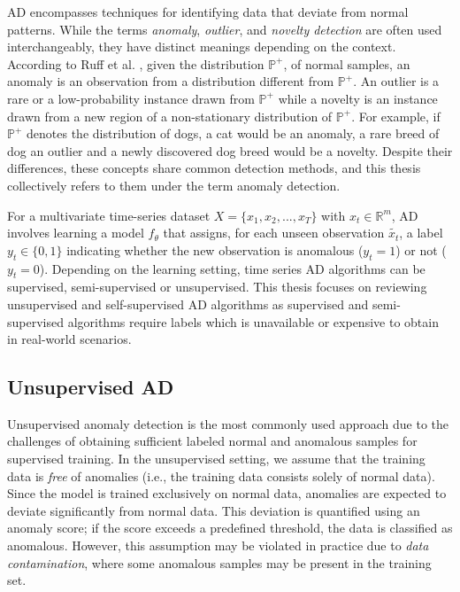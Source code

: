 \ac{AD} encompasses techniques for identifying data that deviate from normal patterns. While the terms \textit{anomaly}, \textit{outlier}, and \textit{novelty detection} are often used interchangeably, they have distinct meanings depending on the context. According to Ruff et al. \cite{ruff2021unifying}, given the distribution $\mathbb{P}^+$, of normal samples, an anomaly is an observation from a distribution different from $\mathbb{P}^+$. An outlier is a rare or a low-probability instance drawn from $\mathbb{P}^+$ while a novelty is an instance drawn from a new region of a non-stationary distribution of $\mathbb{P}^+$. For example, if $\mathbb{P}^+$ denotes the distribution of dogs, a cat would be an anomaly, a rare breed of dog an outlier and a newly discovered dog breed would be a novelty.  Despite their differences, these concepts share common detection methods, and this thesis collectively refers to them under the term anomaly detection.

For a multivariate time-series dataset $X = \{ x_1, x_2, ..., x_T\}$ with $x_t \in \mathbb{R}^m$, AD involves learning a model $f_{\theta}$ that assigns, for each unseen observation $\tilde{x_t}$, a label $y_t \in \{0, 1\}$ indicating whether the new observation is anomalous ($y_t = 1$) or not ($y_t = 0$). Depending on the learning setting, time series AD algorithms can be supervised, semi-supervised or unsupervised. This thesis focuses on reviewing unsupervised and self-supervised AD algorithms as supervised and semi-supervised algorithms require labels which is unavailable or expensive to obtain in real-world scenarios.

\subsection{Unsupervised AD}
Unsupervised anomaly detection is the most commonly used approach due to the challenges of obtaining sufficient labeled normal and anomalous samples for supervised training. In the unsupervised setting, we assume that the training data is \textit{free} of anomalies (i.e., the training data consists solely of normal data). Since the model is trained exclusively on normal data, anomalies are expected to deviate significantly from normal data. This deviation is quantified using an anomaly score; if the score exceeds a predefined threshold, the data is classified as anomalous. However, this assumption may be violated in practice due to \textit{data contamination}, where some anomalous samples may be present in the training set. 

